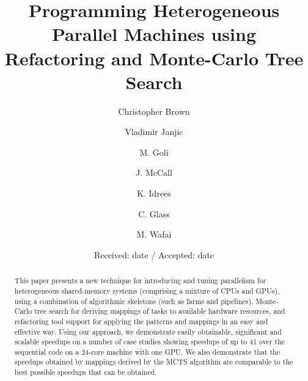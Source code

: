 \documentclass[smallextended]{svjour3}
\begin{document}
	\title{Programming Heterogeneous Parallel Machines using Refactoring and Monte-Carlo Tree Search}


\author{Christopher Brown         \and
	Vladimir Janjic  \and 
	M. Goli \and
	J. McCall \and
	K. Idrees \and
	C. Glass \and
	M. Wafai
}



\date{Received: date / Accepted: date}


\maketitle

\begin{abstract}
This paper presents a new technique for 
introducing and tuning parallelism for heterogeneous shared-memory systems (comprising a
mixture of CPUs and GPUs), using a combination of algorithmic skeletons (such as farms and pipelines),
Monte-Carlo tree search for deriving mappings of tasks to available hardware resources, and refactoring
tool support for applying the patterns and mappings in an easy and effective way.
Using our approach, we demonstrate easily obtainable, significant and scalable speedups on a number of case studies showing speedups of up to 41 over the sequential code on a 24-core machine
with one GPU. We also demonstrate that 
the speedups obtained by mappings derived by the MCTS algorithm are comparable to
the best possible speedups that can be obtained. %
\end{abstract}
\end{document}
